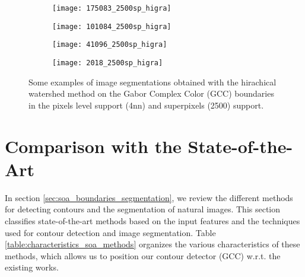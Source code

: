 \begin{figure}[!ht]
    \begin{subfigure}[t]{\textwidth+20pt\relax}
    	\centering
    	\texttt{[image: 175083\_2500sp\_higra]} 
    \end{subfigure}      
    \begin{subfigure}[b]{0.23\textwidth}
    	\centering
        \texttt{[image: 101084\_2500sp\_higra]}
    \end{subfigure}
    \begin{subfigure}[b]{0.23\textwidth}
    	\centering
        \texttt{[image: 41096\_2500sp\_higra]}
    \end{subfigure}
    \begin{subfigure}[b]{0.23\textwidth}
    	\centering
        \texttt{[image: 2018\_2500sp\_higra]}
    \end{subfigure}   
    
	\caption{Some examples of image segmentations obtained with the hirachical watershed method on the Gabor Complex Color (GCC) boundaries in the pixels level support (4nn) and superpixels (2500) support.}\label{fig:GCC_higra_results}    
\end{figure}



\section{Comparison with the State-of-the-Art}
In section \ref{sec:soa_boundaries_segmentation}, we review the different methods for detecting contours and the segmentation of natural images. This section classifies state-of-the-art methods based on the input features and the techniques used for contour detection and image segmentation. Table \ref{table:characteristics_soa_methods} organizes the various characteristics of these methods, which allows us to position our contour detector (GCC) w.r.t. the existing works.

